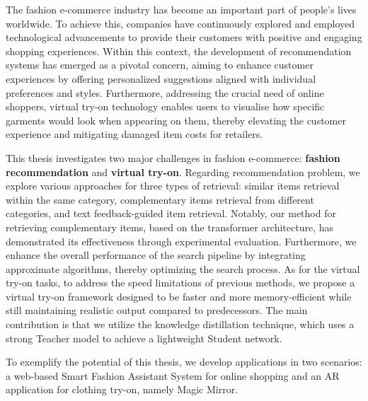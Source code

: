 \begin{EnAbstract}
The fashion e-commerce industry has become an important part of people's lives worldwide. To achieve this, companies have continuously explored and employed technological advancements to provide their customers with positive and engaging shopping experiences. Within this context, the development of recommendation systems has emerged as a pivotal concern, aiming to enhance customer experiences by offering personalized suggestions aligned with individual preferences and styles. Furthermore, addressing the crucial need of online shoppers, virtual try-on technology enables users to visualise how specific garments would look when appearing on them, thereby elevating the customer experience and mitigating damaged item costs for retailers.

This thesis investigates two major challenges in fashion e-commerce: \textbf{fashion recommendation} and \textbf{virtual try-on}. Regarding recommendation problem, we explore various approaches for three types of retrieval: similar items retrieval within the same category, complementary items retrieval from different categories, and text feedback-guided item retrieval. Notably, our method for retrieving complementary items, based on the transformer architecture, has demonstrated its effectiveness through experimental evaluation. Furthermore, we enhance the overall performance of the search pipeline by integrating approximate algorithms, thereby optimizing the search process. As for the virtual try-on tasks, to address the speed limitations of previous methods, we propose a virtual try-on framework designed to be faster and more memory-efficient while still maintaining realistic output compared to predecessors. The main contribution is that we utilize the knowledge distillation technique, which uses a strong Teacher model to achieve a lightweight Student network.

To exemplify the potential of this thesis, we develop applications in two scenarios: a web-based Smart Fashion Assistant System for online shopping and an AR application for clothing try-on, namely Magic Mirror.


\end{EnAbstract}